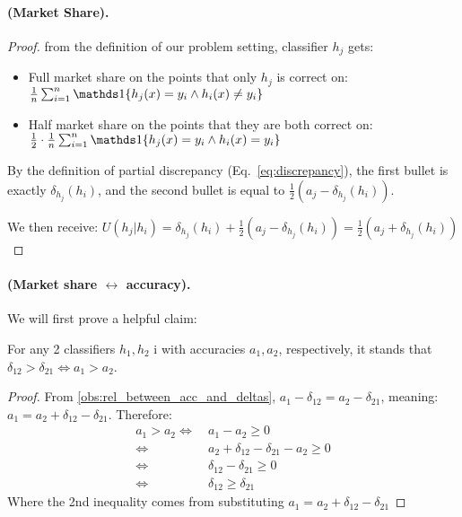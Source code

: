 \paragraph{ (Market Share).}
\begin{proof}
    from the definition of our problem setting, classifier $h_j$ gets: 
    \begin{itemize}[leftmargin=0.5cm]
        \item Full market share on the points that only $h_j$ is correct on: $\frac{1}{n} \sum_{i=1}^n \one{h_j(x) = y_i \land h_i(x) \ne y_i}$
        \item Half market share on the points that they are both correct on: $\frac{1}{2}\cdot\frac{1}{n} \sum_{i=1}^n \one{h_j(x) = y_i \land h_i(x) = y_i}$
    \end{itemize}
    By the definition of partial discrepancy (Eq.~\ref{eq:discrepancy}), the first bullet is exactly $\delta_{h_j}(h_i)$, and the second bullet is equal to $\frac{1}{2}(a_j - \delta_{h_j}(h_i))$.
    
    We then receive: $U(h_j|h_i) = \delta_{h_j}(h_i) + \frac{1}{2}(a_j - \delta_{h_j}(h_i)) = \frac{1}{2}(a_j + \delta_{h_j}(h_i))$  
\end{proof}

\paragraph{ (Market share $\leftrightarrow$ accuracy).}
We will first prove a helpful claim:
\begin{helpful_claim}
\label{hc:higher_acc_is_higher_partial_delta}
    For any 2 classifiers $h_1,h_2$ i with accuracies $a_1,a_2$, respectively, it stands that 
    $\delta_{12} > \delta_{21} \Leftrightarrow a_1 > a_2$.
\end{helpful_claim}
\begin{proof}
     From \cref{obs:rel_between_acc_and_deltas}, 
    $a_{1} -\delta_{12} = a_2  - \delta_{21}$, meaning: $ a_{1}  = a_2 + \delta_{12} - \delta_{21} $.
    Therefore:
    \begin{equation*}
    \begin{split}
        a_1 > a_2 \Leftrightarrow & \  a_1  - a_2 \ge 0 \\ 
         \Leftrightarrow & \  a_2 + \delta_{12} - \delta_{21} - a_2 \ge 0 \\ 
        \Leftrightarrow & \ \delta_{12} - \delta_{21} \ge 0 \\
        \Leftrightarrow & \ \delta_{12} \ge \delta_{21} 
    \end{split}
    \end{equation*}
    Where the 2nd inequality comes from substituting $a_1 =  a_2 + \delta_{12} - \delta_{21} $
\end{proof}

